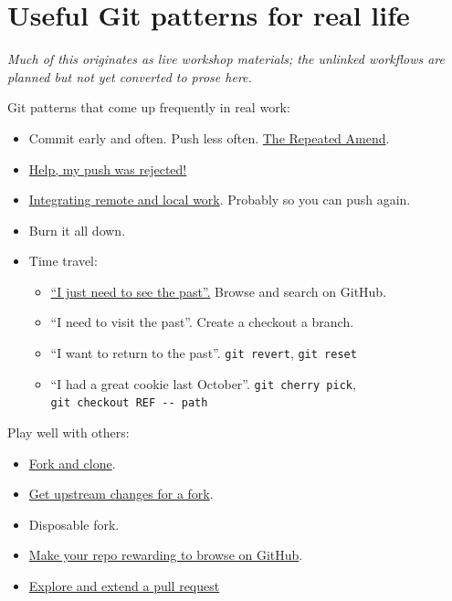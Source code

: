 \documentclass[
]{book}
\providecommand{\tightlist}{%
  \setlength{\itemsep}{0pt}\setlength{\parskip}{0pt}}
\begin{document}
\chapter*{Useful Git patterns for real life}\label{workflows-intro}

\emph{Much of this originates as live workshop materials; the unlinked workflows are planned but not yet converted to prose here.}

Git patterns that come up frequently in real work:

\begin{itemize}
\tightlist
\item
  Commit early and often. Push less often. \hyperref[repeated-amend]{The Repeated Amend}.
\item
  \hyperref[push-rejected]{Help, my push was rejected!}
\item
  \hyperref[pull-tricky]{Integrating remote and local work}. Probably so you can push again.
\item
  Burn it all down.
\item
  Time travel:

  \begin{itemize}
  \tightlist
  \item
    \hyperref[time-travel-see-past]{``I just need to see the past''.} Browse and search on GitHub.
  \item
    ``I need to visit the past''. Create a checkout a branch.
  \item
    ``I want to return to the past''. \texttt{git\ revert}, \texttt{git\ reset}
  \item
    ``I had a great cookie last October''. \texttt{git\ cherry\ pick}, \texttt{git\ checkout\ REF\ -\/-\ path}
  \end{itemize}
\end{itemize}

Play well with others:

\begin{itemize}
\tightlist
\item
  \hyperref[fork-and-clone]{Fork and clone}.
\item
  \hyperref[upstream-changes]{Get upstream changes for a fork}.
\item
  Disposable fork.
\item
  \hyperref[workflows-browsability]{Make your repo rewarding to browse on GitHub}.
\item
  \hyperref[pr-extend]{Explore and extend a pull request}
\end{itemize}
\end{document}
